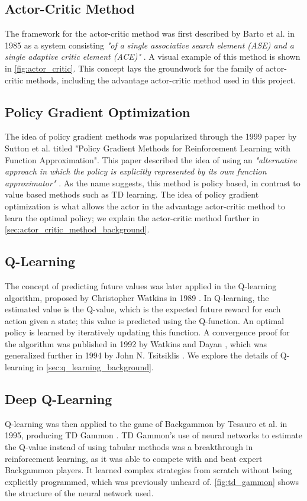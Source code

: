 \subsection{Actor-Critic Method}
The framework for the actor-critic method was first described by Barto et al.
in 1985 as a system consisting \textit{"of a single associative search element
  (ASE) and a single adaptive critic element (ACE)"} \cite{barto1983neuronlike}.
A visual example of this method is shown in \autoref{fig:actor_critic}. This
concept lays the groundwork for the family of actor-critic methods, including
the advantage actor-critic method used in this project.



\subsection{Policy Gradient Optimization}
The idea of policy gradient methods was popularized through the 1999 paper by
Sutton et al. titled "Policy Gradient Methods for Reinforcement Learning with
Function Approximation". This paper described the idea of using an
\textit{"alternative approach in which the policy is explicitly represented by
  its own function approximator"} \cite{sutton1999policy}. As the name suggests,
this method is policy based, in contrast to value based methods such as TD
learning. The idea of policy gradient optimization is what allows the actor in
the advantage actor-critic method to learn the optimal policy; we explain the
actor-critic method further in \autoref{sec:actor_critic_method_background}.

\subsection{Q-Learning}
The concept of predicting future values was later applied in the Q-learning
algorithm, proposed by Christopher Watkins in 1989 \cite{watkins1989learning}.
In Q-learning, the estimated value is the Q-value, which is the expected future
reward for each action given a state; this value is predicted using the
Q-function. An optimal policy is learned by iteratively updating this function.
A convergence proof for the algorithm was published in 1992 by Watkins and
Dayan \cite{watkins1992q}, which was generalized further in 1994 by John N.
Tsitsiklis \cite{tsitsiklis1994asynchronous}. We explore the details of
Q-learning in \autoref{sec:q_learning_background}.

\subsection{Deep Q-Learning}
Q-learning was then applied to the game of Backgammon by Tesauro et al. in
1995, producing TD Gammon \cite{tesauro1995temporal}. TD Gammon's use of neural
networks to estimate the Q-value instead of using tabular methods was a
breakthrough in reinforcement learning, as it was able to compete with and beat
expert Backgammon players. It learned complex strategies from scratch without
being explicitly programmed, which was previously unheard of.
\autoref{fig:td_gammon} shows the structure of the neural network used.


